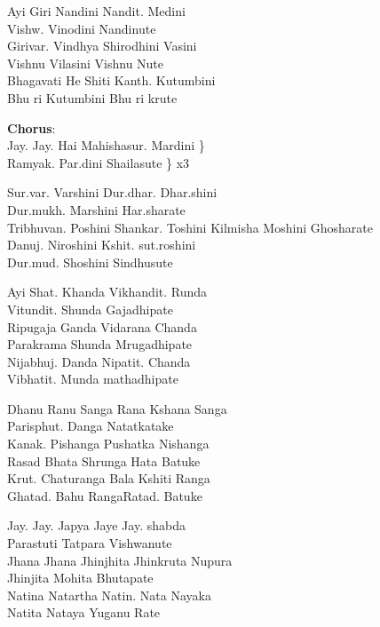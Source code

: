 
Ayi Giri Nandini Nandit. Medini \\
Vishw. Vinodini Nandinute \\
Girivar. Vindhya Shirodhini Vasini \\
Vishnu Vilasini Vishnu Nute \\
Bhagavati He Shiti Kanth. Kutumbini \\
Bhu ri Kutumbini Bhu ri krute  \linebreak[2]

{\bf Chorus}: \\
Jay. Jay. Hai Mahishasur. Mardini \} \\
Ramyak. Par.dini Shailasute \} x3 \linebreak[2]

Sur.var. Varshini Dur.dhar. Dhar.shini \\
Dur.mukh. Marshini Har.sharate \\ 
Tribhuvan. Poshini Shankar. Toshini
Kilmisha Moshini Ghosharate \\
Danuj. Niroshini Kshit. sut.roshini \\
Dur.mud. Shoshini Sindhusute \linebreak[2]

Ayi Shat. Khanda Vikhandit. Runda \\
Vitundit. Shunda Gajadhipate \\
Ripugaja Ganda Vidarana Chanda \\
Parakrama Shunda Mrugadhipate \\
Nijabhuj. Danda Nipatit. Chanda \\
Vibhatit. Munda mathadhipate \linebreak[2]

Dhanu Ranu Sanga Rana Kshana Sanga \\
Parisphut. Danga Natatkatake \\
Kanak. Pishanga Pushatka Nishanga \\
Rasad Bhata Shrunga Hata Batuke \\
Krut. Chaturanga Bala Kshiti Ranga \\
Ghatad. Bahu RangaRatad. Batuke \linebreak[2]

Jay. Jay. Japya Jaye Jay. shabda \\
Parastuti Tatpara Vishwanute \\
Jhana Jhana Jhinjhita Jhinkruta Nupura \\
Jhinjita Mohita Bhutapate \\
Natina Natartha Natin. Nata Nayaka \\
Natita Nataya Yuganu Rate \linebreak[2]

